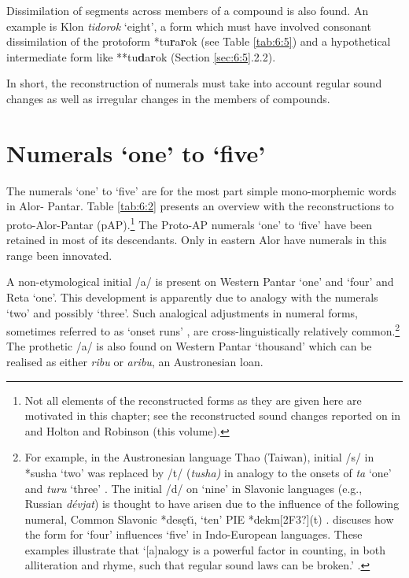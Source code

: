 \documentclass[output=paper]{LSP/langsci}
\begin{document}
 

Dissimilation of segments across members of a compound is also found. An example is Klon \textit{tidorok} `eight', a form which must have involved consonant dissimilation of the protoform *tu\textbf{r}a\textbf{r}ok (see Table \ref{tab:6:5}) and a hypothetical intermediate form like **tu\textbf{d}a\textbf{r}ok (Section \ref{sec:6:5}.2.2).

In short, the reconstruction of numerals must take into account regular sound changes as well as irregular changes in the members of compounds. 

\section{Numerals `one' to `five'}\label{sec:6:4}
The numerals `one' to `five' are for the most part simple mono-morphemic words in Alor- Pantar. Table \ref{tab:6:2} presents an overview with the reconstructions to proto-Alor-Pantar (pAP).\footnote{{}   Not all elements of the reconstructed forms as they are given here are motivated in this chapter; see the reconstructed sound changes reported on in \citet{HoltonEtAl2012} and Holton and Robinson (this volume).}  The Proto-AP numerals `one' to `five' have been retained in most of its descendants. Only in eastern Alor have numerals in this range been innovated. 

A non-etymological initial /a/ is present on Western Pantar `one' and `four' and Reta `one'. This development is apparently due to analogy with the numerals `two' and possibly `three'. Such analogical adjustments in numeral forms, sometimes referred to as `onset runs' \citep{Matisoff1995}, are cross-linguistically relatively common.\footnote{{}   For example, in the Austronesian language Thao (Taiwan), initial /s/ in *susha `two' was replaced by /t/ (\textit{tusha)} in analogy to the onsets of \textit{ta} `one' and \textit{turu} `three' \citep[274]{Blust2009}. The initial /d/ on `nine' in Slavonic languages (e.g., Russian \textit{d\'evjat}) is thought to have arisen due to the influence of the following numeral, Common Slavonic *des\k{e}t\u{\i}, `ten' PIE *dekm[2F3?](t) \citep[760]{Comrie1992}. \citet{Winter1964} discuses how the form for `four' influences `five' in Indo-European languages. These examples illustrate that `[a]nalogy is a powerful factor in counting, in both alliteration and rhyme, such that regular sound laws can be broken.' \citep[256]{Sidwell1999}.} The prothetic /a/ is also found on Western Pantar `thousand' which can be realised as either \textit{ribu} or \textit{aribu}, an Austronesian loan. 
\end{document}
